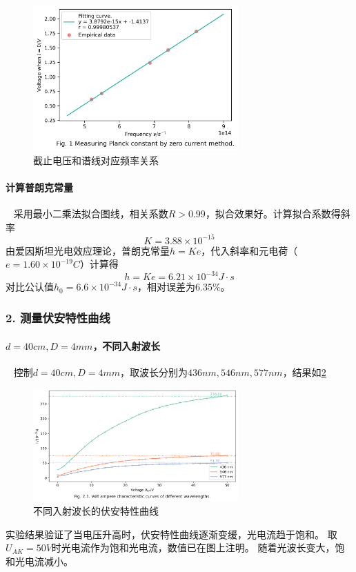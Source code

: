 \documentclass[12pt,a4paper,UTF8]{ctexart}
\begin{document}
		\begin{figure}[htbp]
			\centering
			\includegraphics[width=0.7\textwidth]{attachments/fig.1.png}
			\caption{截止电压和谱线对应频率关系}
			\label{fig:1}
		\end{figure}
        \paragraph{计算普朗克常量}~
        \newline
		\indent
        采用最小二乘法拟合图线，相关系数$R>0.99$，拟合效果好。计算拟合系数得斜率
        $$
            K = 3.88 \times 10^{-15}       
        $$
        由爱因斯坦光电效应理论，普朗克常量$h = Ke$，代入斜率和元电荷（$e = 1.60 \times 10^{-19} C$）计算得
        $$
        h = Ke = 6.21 \times 10^{-34} J \cdot s
        $$
        对比公认值$h_0 = 6.6 \times 10^{-34} J \cdot s$，相对误差为$6.35\%$。
        
        
    \subsubsection*{2. 测量伏安特性曲线}
    \paragraph{$d=40cm, D=4mm$，不同入射波长}~
    \newline
    \indent
    控制$d=40cm, D=4mm$，取波长分别为$436nm, 546nm, 577nm$，结果如\ref{fig:2.1}
    \begin{figure}[htbp]
        \centering
        \includegraphics[width=0.7\textwidth]{attachments/fig.2.1.png}
        \caption{不同入射波长的伏安特性曲线}
        \label{fig:2.1}
    \end{figure}
    实验结果验证了当电压升高时，伏安特性曲线逐渐变缓，光电流趋于饱和。
    取$U_{AK} = 50V$时光电流作为饱和光电流，数值已在图上注明。
    随着光波长变大，饱和光电流减小。
    
\end{document}
